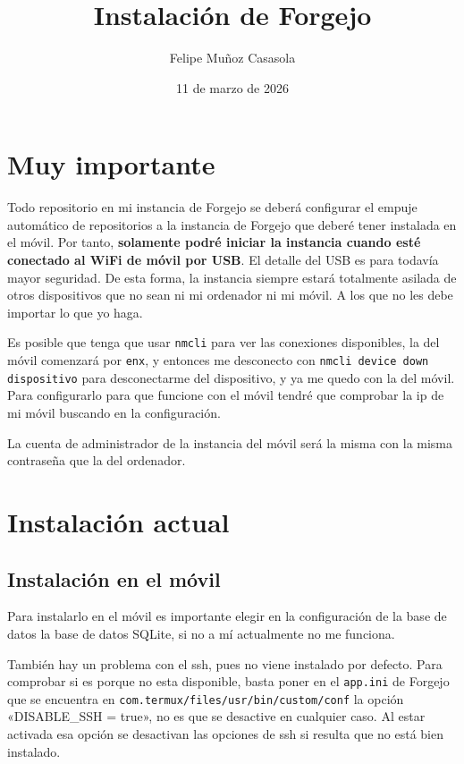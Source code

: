 \documentclass{article}
\title{Instalación de Forgejo}
\author{Felipe Muñoz Casasola}
\date{11 de marzo de 2026}
\begin{document}
    \maketitle
    \clearpage
    \tableofcontents
    \clearpage

    \section{Muy importante}
    Todo repositorio en mi instancia de Forgejo se deberá configurar el empuje
    automático de repositorios a la instancia de Forgejo que deberé tener instalada
    en el móvil. Por tanto, \textbf{solamente podré iniciar la instancia cuando
    esté conectado al WiFi de móvil por USB}. El detalle del USB es para todavía
    mayor seguridad. De esta forma, la instancia siempre estará totalmente asilada
    de otros dispositivos que no sean ni mi ordenador ni mi móvil. A los que no
    les debe importar lo que yo haga.

    Es posible que tenga que usar \texttt{nmcli} para ver las conexiones disponibles,
    la del móvil comenzará por \texttt{enx}, y entonces me desconecto con \texttt{nmcli device
    down dispositivo} para desconectarme del dispositivo, y ya me quedo con la del móvil.
    Para configurarlo para que funcione con el móvil tendré que comprobar
    la ip de mi móvil buscando en la configuración.

    La cuenta de administrador de la instancia del móvil será la misma con la
    misma contraseña que la del ordenador.

    \section{Instalación actual}

    \subsection{Instalación en el móvil}
    Para instalarlo en el móvil es importante elegir en la configuración de la base de
    datos la base de datos SQLite, si no a mí actualmente no me funciona.

    También hay un problema con el ssh, pues no viene instalado por defecto. Para comprobar
    si es porque no esta disponible, basta poner en el \texttt{app.ini} de Forgejo que
    se encuentra en \texttt{com.termux/files/usr/bin/custom/conf} la opción
    «DISABLE\_SSH = true»,
    no es que se desactive en cualquier caso. Al estar activada esa opción se
    desactivan las opciones de ssh si resulta que no está bien instalado.
\end{document}
